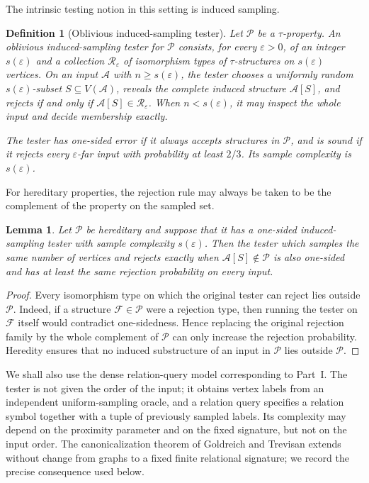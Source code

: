 \documentclass[11pt,reqno,letterpaper]{amsart}
\newcommand{\cA}{{\mathcal A}}
\newcommand{\cP}{{\mathcal P}}
\newcommand{\cR}{{\mathcal R}}
\newcommand{\cF}{{\mathcal F}}
\theoremstyle{plain}
\newtheorem{lem}[thm]{Lemma}
\newtheorem{defn}[thm]{Definition}
\theoremstyle{remark}
\begin{document}
The intrinsic testing notion in this setting is induced sampling.

\begin{defn}[Oblivious induced-sampling tester]
Let $\cP$ be a $\tau$-property.  An \textit{oblivious induced-sampling tester}
for $\cP$ consists, for every $\varepsilon>0$, of an integer
$s(\varepsilon)$ and a collection $\cR_\varepsilon$ of isomorphism types of
$\tau$-structures on $s(\varepsilon)$ vertices.  On an input $\cA$ with
$n\geq s(\varepsilon)$, the tester chooses a uniformly random
$s(\varepsilon)$-subset $S\subseteq V(\cA)$, reveals the complete induced
structure $\cA[S]$, and rejects if and only if
$\cA[S]\in\cR_\varepsilon$.  When $n<s(\varepsilon)$, it may inspect the
whole input and decide membership exactly.

The tester has one-sided error if it always accepts structures in $\cP$, and
is sound if it rejects every $\varepsilon$-far input with probability at least
$2/3$.  Its sample complexity is $s(\varepsilon)$.
\end{defn}

For hereditary properties, the rejection rule may always be taken to be the
complement of the property on the sampled set.

\begin{lem}\label{lem:relational-membership-rule}
Let $\cP$ be hereditary and suppose that it has a one-sided induced-sampling
tester with sample complexity $s(\varepsilon)$.  Then the tester which samples
the same number of vertices and rejects exactly when
$\cA[S]\notin\cP$ is also one-sided and has at least the same rejection
probability on every input.
\end{lem}

\begin{proof}
Every isomorphism type on which the original tester can reject lies outside
$\cP$.  Indeed, if a structure $\cF\in\cP$ were a rejection type, then running
the tester on $\cF$ itself would contradict one-sidedness.  Hence replacing
the original rejection family by the whole complement of $\cP$ can only
increase the rejection probability.  Heredity ensures that no induced
substructure of an input in $\cP$ lies outside $\cP$.
\end{proof}

We shall also use the dense relation-query model corresponding to Part~I.
The tester is not given the order of the input; it obtains vertex labels from
an independent uniform-sampling oracle, and a relation query specifies a
relation symbol together with a tuple of previously sampled labels.  Its
complexity may depend on the proximity parameter and on the fixed signature,
but not on the input order.  The canonicalization theorem of Goldreich and
Trevisan \cite{goldreichTrevisan2003three} extends without change from graphs
to a fixed finite relational signature; we record the precise consequence
used below.
\end{document}
